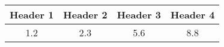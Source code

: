 \begin{tabular}{|c|c|c|c|}
\hline
Header 1 & Header 2 & Header 3 & Header 4 \\
\hline
1.2 & 2.3 & 5.6 & 8.8 \\
\hline
\end{tabular}